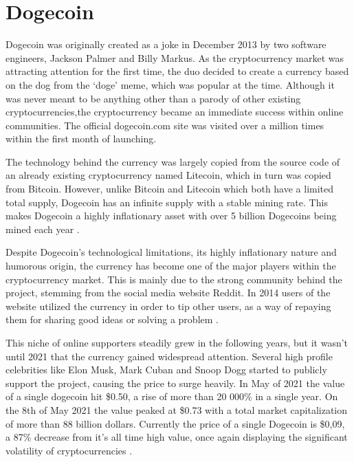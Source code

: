 \section{Dogecoin} \bigbreak

Dogecoin was originally created as a joke in December 2013 by two software engineers, Jackson Palmer and Billy Markus. As the cryptocurrency market was attracting attention for the first time, the duo decided to create a currency based on the dog from the ‘doge’ meme, which was popular at the time. Although it was never meant to be anything other than a parody of other existing cryptocurrencies,the cryptocurrency became an immediate success within online communities. The official dogecoin.com site was visited over a million times within the first month of launching. \autocite{Kay2021} \bigbreak

The technology behind the currency was largely copied from the source code of an already existing cryptocurrency named Litecoin, which in turn was copied from Bitcoin. However, unlike Bitcoin and Litecoin which both have a limited total supply, Dogecoin has an infinite supply with a stable mining rate\autocite{Frankenfield2022}. This makes Dogecoin a highly inflationary asset with over 5 billion Dogecoins being mined each year \autocite{Nibley2022}. \bigbreak

Despite Dogecoin’s technological limitations, its highly inflationary nature and humorous origin, the currency has become one of the major players within the cryptocurrency market. This is mainly due to the strong community behind the project, stemming from the social media website Reddit. In 2014 users of the website utilized the currency in order to tip other users, as a way of repaying them for sharing good ideas or solving a problem \autocite{Frankenfield2022}. \bigbreak

This niche of online supporters steadily grew in the following years, but it wasn’t until 2021 that the currency gained widespread attention. Several high profile celebrities like Elon Musk, Mark Cuban and Snoop Dogg started to publicly support the project, causing the price to surge heavily\autocite{Kay2021}. In May of 2021 the value of a single dogecoin hit \$0.50, a rise of more than 20 000\% in a single year. On the 8th of May 2021 the value peaked at \$0.73 with a total market capitalization of more than 88 billion dollars. Currently the price of a single Dogecoin is \$0,09, a 87\% decrease from it’s all time high value, once again displaying the significant volatility of cryptocurrencies \autocite{Coingecko2023}. \bigbreak

